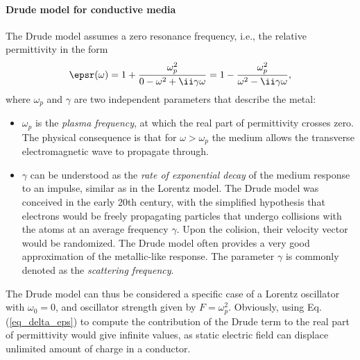 \paragraph{Drude model for conductive media} \label{chap_fdtd_drude}  %
The Drude model assumes a zero resonance frequency, i.e., the relative permittivity in the form
\begin{equation} \epsr(\omega) = 1 + \frac{\omega_p^{2}}{0 - \omega^{2} + \ii\gamma\omega} = 1 - \frac{\omega_p^{2}}{\omega^{2} - \ii\gamma\omega}, \label{eq_drude_eps}\end{equation}
where $\omega_p$ and $\gamma$ are two independent parameters that describe the metal: 
\begin{itemize}
 \item{$\omega_p$ is the \textit{plasma frequency}, at which the real part of permittivity crosses zero. The physical consequence is that for $\omega > \omega_p$ the medium allows the transverse electromagnetic wave to propagate through. 
 } 
 \item{$\gamma$ can be understood as the \textit{rate of exponential decay} of the medium response to an impulse, similar as in the Lorentz model. The Drude model was conceived in the early 20th century, with the simplified hypothesis that electrons would be freely propagating particles that undergo 
collisions 
	with the atoms %
at an average frequency $\gamma$. Upon the colision, their 
	velocity vector %
would be randomized. 
The Drude model often provides a very good approximation of the metallic-like response.
The parameter $\gamma$ is commonly denoted as the \textit{scattering frequency}.} 
 \end{itemize}
The Drude model can thus be considered a specific case of a Lorentz oscillator with $\omega_0 = 0$, and oscillator strength given by $F = \omega_p^2$. 
Obviously, using Eq. (\ref{eq_delta_eps}) to compute the contribution of the Drude term to the real part of permittivity would give infinite values, as static electric field can displace unlimited amount of charge in a conductor.

